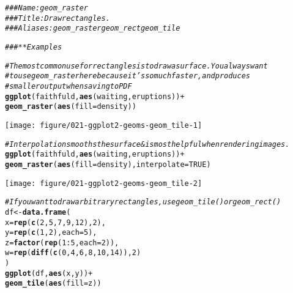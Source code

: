 \documentclass[a4paper,titlepage]{tufte-handout}\usepackage[]{graphicx}\usepackage[]{color}
\makeatletter
\def\maxwidth{ %
  \ifdim\Gin@nat@width>\linewidth
    \linewidth
  \else
    \Gin@nat@width
  \fi
}
\newcommand{\hlnum}[1]{\textcolor[rgb]{0.686,0.059,0.569}{#1}}%
\newcommand{\hlcom}[1]{\textcolor[rgb]{0.678,0.584,0.686}{\textit{#1}}}%
\newcommand{\hlopt}[1]{\textcolor[rgb]{0,0,0}{#1}}%
\newcommand{\hlstd}[1]{\textcolor[rgb]{0.345,0.345,0.345}{#1}}%
\newcommand{\hlkwb}[1]{\textcolor[rgb]{0.69,0.353,0.396}{#1}}%
\newcommand{\hlkwc}[1]{\textcolor[rgb]{0.333,0.667,0.333}{#1}}%
\newcommand{\hlkwd}[1]{\textcolor[rgb]{0.737,0.353,0.396}{\textbf{#1}}}%
\newenvironment{kframe}{%
 \def\at@end@of@kframe{}%
 \ifinner\ifhmode%
  \def\at@end@of@kframe{\end{minipage}}%
  \begin{minipage}{\columnwidth}%
 \fi\fi%
 \def\FrameCommand##1{\hskip\@totalleftmargin \hskip-\fboxsep
 \colorbox{shadecolor}{##1}\hskip-\fboxsep
     \hskip-\linewidth \hskip-\@totalleftmargin \hskip\columnwidth}%
 \MakeFramed {\advance\hsize-\width
   \@totalleftmargin\z@ \linewidth\hsize
   \@setminipage}}%
 {\par\unskip\endMakeFramed%
 \at@end@of@kframe}
\newenvironment{knitrout}{}{} %
\makeatother
\begin{document}
\begin{knitrout}
\color{fgcolor}\begin{kframe}
\begin{alltt}
\hlcom{### Name: geom_raster}
\hlcom{### Title: Draw rectangles.}
\hlcom{### Aliases: geom_raster geom_rect geom_tile}

\hlcom{### ** Examples}

\hlcom{# The most common use for rectangles is to draw a surface. You always want}
\hlcom{# to use geom_raster here because it's so much faster, and produces}
\hlcom{# smaller output when saving to PDF}
\hlkwd{ggplot}\hlstd{(faithfuld,} \hlkwd{aes}\hlstd{(waiting, eruptions))} \hlopt{+}
 \hlkwd{geom_raster}\hlstd{(}\hlkwd{aes}\hlstd{(}\hlkwc{fill} \hlstd{= density))}
\end{alltt}
\end{kframe}
\texttt{[image: figure/021-ggplot2-geoms-geom\_tile-1]} 
\begin{kframe}\begin{alltt}
\hlcom{# Interpolation smooths the surface & is most helpful when rendering images.}
\hlkwd{ggplot}\hlstd{(faithfuld,} \hlkwd{aes}\hlstd{(waiting, eruptions))} \hlopt{+}
 \hlkwd{geom_raster}\hlstd{(}\hlkwd{aes}\hlstd{(}\hlkwc{fill} \hlstd{= density),} \hlkwc{interpolate} \hlstd{=} \hlnum{TRUE}\hlstd{)}
\end{alltt}
\end{kframe}
\texttt{[image: figure/021-ggplot2-geoms-geom\_tile-2]} 
\begin{kframe}\begin{alltt}
\hlcom{# If you want to draw arbitrary rectangles, use geom_tile() or geom_rect()}
\hlstd{df} \hlkwb{<-} \hlkwd{data.frame}\hlstd{(}
  \hlkwc{x} \hlstd{=} \hlkwd{rep}\hlstd{(}\hlkwd{c}\hlstd{(}\hlnum{2}\hlstd{,} \hlnum{5}\hlstd{,} \hlnum{7}\hlstd{,} \hlnum{9}\hlstd{,} \hlnum{12}\hlstd{),} \hlnum{2}\hlstd{),}
  \hlkwc{y} \hlstd{=} \hlkwd{rep}\hlstd{(}\hlkwd{c}\hlstd{(}\hlnum{1}\hlstd{,} \hlnum{2}\hlstd{),} \hlkwc{each} \hlstd{=} \hlnum{5}\hlstd{),}
  \hlkwc{z} \hlstd{=} \hlkwd{factor}\hlstd{(}\hlkwd{rep}\hlstd{(}\hlnum{1}\hlopt{:}\hlnum{5}\hlstd{,} \hlkwc{each} \hlstd{=} \hlnum{2}\hlstd{)),}
  \hlkwc{w} \hlstd{=} \hlkwd{rep}\hlstd{(}\hlkwd{diff}\hlstd{(}\hlkwd{c}\hlstd{(}\hlnum{0}\hlstd{,} \hlnum{4}\hlstd{,} \hlnum{6}\hlstd{,} \hlnum{8}\hlstd{,} \hlnum{10}\hlstd{,} \hlnum{14}\hlstd{)),} \hlnum{2}\hlstd{)}
\hlstd{)}
\hlkwd{ggplot}\hlstd{(df,} \hlkwd{aes}\hlstd{(x, y))} \hlopt{+}
  \hlkwd{geom_tile}\hlstd{(}\hlkwd{aes}\hlstd{(}\hlkwc{fill} \hlstd{= z))}

\end{alltt}
\end{kframe}
\end{knitrout}
\end{document}
